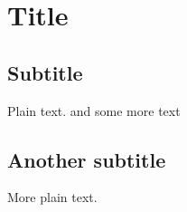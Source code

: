 \documentclass{article}
\begin{document}
\section{Title}

\subsection{Subtitle}

Plain text. and some more text \cite{Taentzer2004}

\subsection{Another subtitle}

More plain text.

 

\end{document}
